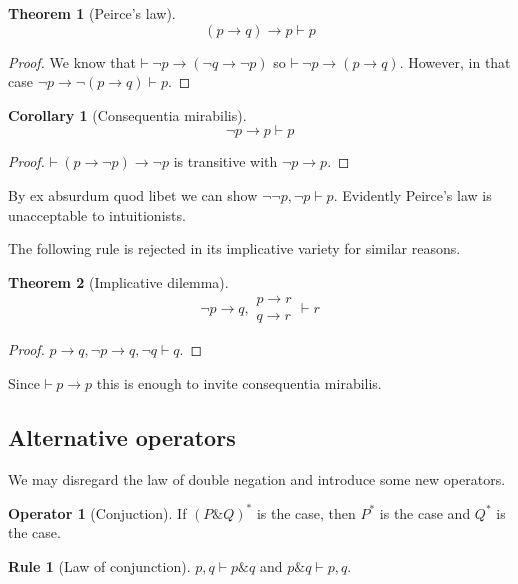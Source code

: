 \documentclass{amsbook}
\newcommand{\infers}{\mathrel\vdash}
\newcommand{\theorem}{\mathord\vdash\medspace}
\newcommand{\then}{\mathrel\rightarrow}
\newcommand{\conj}{\mathrel\&}
\theoremstyle{definition}
\newtheorem{frule}{Rule}[chapter]
\newtheorem{op}{Operator}[chapter]
\newtheorem{thm}{Theorem}[section]
\newtheorem{crl}{Corollary}[section]
\begin{document}
\begin{thm}[Peirce's law]
    $$(p \then q) \then p \infers p$$
    \begin{proof}
        We know that $\theorem \neg p \then (\neg q \then \neg p)$ so $\theorem \neg p \then (p \then q)$. However, in that case $\neg p \then \neg(p \then q) \infers p$.
    \end{proof}
\end{thm}

\begin{crl}[Consequentia mirabilis]
    $$\neg p \then p \infers p$$
    \begin{proof}
        $\theorem (p \then \neg p) \then \neg p$ is transitive with $\neg p \then p$.
    \end{proof}
\end{crl}

By ex absurdum quod libet we can show $\neg\neg p, \neg p \infers p$. Evidently Peirce's law is unacceptable to intuitionists.

The following rule is rejected in its implicative variety for similar reasons.

\begin{thm}[Implicative dilemma]
    $$\neg p \then q, \begin{aligned}
            p \then r \\
            q \then r
        \end{aligned} \infers r$$
    \begin{proof}
        $p \then q, \neg p \then q, \neg q \infers q$.
    \end{proof}
\end{thm}

Since $\theorem p \then p$ this is enough to invite consequentia mirabilis.

\subsection{Alternative operators}

We may disregard the law of double negation and introduce some new operators.

\begin{op}[Conjuction]
    If $(P \conj Q)^*$ is the case, then $P^*$ is the case and $Q^*$ is the case.
\end{op}

\begin{frule}[Law of conjunction]
    $p, q \infers p \conj q$ and $p \conj q \infers p, q$.
\end{frule}
\end{document}
